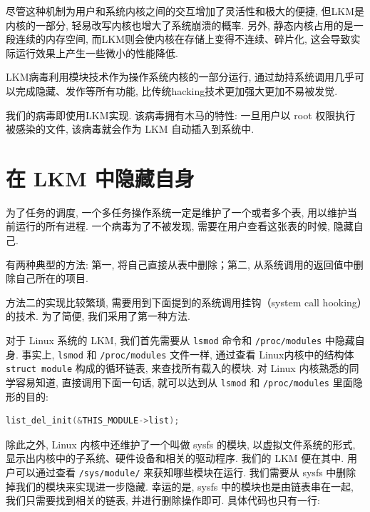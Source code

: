 \documentclass[11pt,fleqn]{book} %
\begin{document}
尽管这种机制为用户和系统内核之间的交互增加了灵活性和极大的便捷, 但LKM是内核的一部分, 轻易改写内核也增大了系统崩溃的概率. 另外,
静态内核占用的是一段连续的内存空间, 而LKM则会使内核在存储上变得不连续、碎片化, 这会导致实际运行效果上产生一些微小的性能降低.

LKM病毒利用模块技术作为操作系统内核的一部分运行, 通过劫持系统调用几乎可以完成隐藏、发作等所有功能, 比传统hacking技术更加强大更加不易被发觉.

我们的病毒即使用LKM实现. 该病毒拥有木马的特性: 一旦用户以 root 权限执行被感染的文件, 该病毒就会作为 LKM 自动插入到系统中.


\section{在 LKM 中隐藏自身}



为了任务的调度, 一个多任务操作系统一定是维护了一个或者多个表, 用以维护当前运行的所有进程. 一个病毒为了不被发现, 需要在用户查看这张表的时候,
隐藏自己. 

有两种典型的方法: 第一, 将自己直接从表中删除；第二, 从系统调用的返回值中删除自己所在的项目. 

方法二的实现比较繁琐, 需要用到下面提到的系统调用挂钩（system call hooking）的技术. 为了简便, 我们采用了第一种方法. 

对于 Linux 系统的 LKM, 我们首先需要从 \texttt{lsmod} 命令和 \texttt{/proc/modules}
中隐藏自身. 事实上, \texttt{lsmod} 和 \texttt{/proc/modules} 文件一样, 通过查看 Linux内核中的结构体
\texttt{struct module} 构成的循环链表, 来查找所有载入的模块.  对 Linux 内核熟悉的同学容易知道,
直接调用下面一句话, 就可以达到从 \texttt{lsmod} 和 \texttt{/proc/modules} 里面隐形的目的:
 



\vspace*{0.5cm}

\begin{lstlisting}[language=C]
list_del_init(&THIS_MODULE->list);
\end{lstlisting}


\vspace*{0.5cm}



除此之外,  Linux 内核中还维护了一个叫做 sysfs 的模块, 以虚拟文件系统的形式, 显示出内核中的子系统、硬件设备和相关的驱动程序.
我们的 LKM 便在其中. 用户可以通过查看 \texttt{/sys/module/} 来获知哪些模块在运行. 我们需要从 sysfs
中删除掉我们的模块来实现进一步隐藏. 幸运的是,  sysfs 中的模块也是由链表串在一起, 我们只需要找到相关的链表, 并进行删除操作即可.
具体代码也只有一行: 
\end{document}
